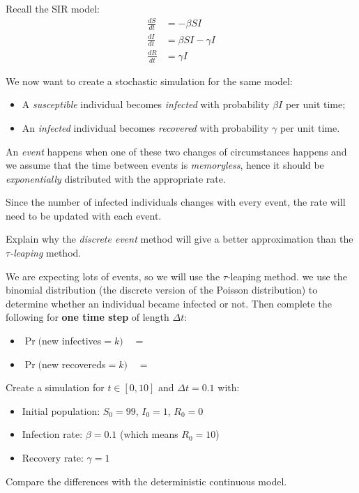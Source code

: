 \begin{slide}
\question \label{SIR_stochastic}
	
Recall the SIR model:
\begin{align*}
\frac{dS}{dt} 	& = - \beta SI \\
\frac{dI}{dt} & = \beta SI - \gamma I \\
\frac{dR}{dt} & = \gamma I
\end{align*}

We now want to create a stochastic simulation for the same model:
\begin{itemize}
	\item A \textit{susceptible} individual becomes \textit{infected} with probability $\beta I$ per unit time;
	\item An \textit{infected} individual becomes \textit{recovered} with probability $\gamma$ per unit time.
\end{itemize}

An \textit{event} happens when one of these two changes of circumstances happens and we assume that the time between events is \textit{memoryless}, hence it should be \textit{exponentially} distributed with the appropriate rate.

Since the number of infected individuals changes with every event, the rate will need to be updated with each event.

\begin{parts}
	\item Explain why the \textit{discrete event} method will give a better approximation than the  \textit{$\tau$-leaping} method.
	\item We are expecting lots of events, so we will use the $\tau$-leaping method.
		we use the binomial distribution (the discrete version of the Poisson distribution) to determine whether an individual became infected or not.
		Then complete the following for \textbf{one time step} of length $\Delta t$:
		\begin{itemize}
			\item $\Pr($new infectives$=k)\quad =\quad $
			\item $\Pr($new recovereds$=k)\quad =\quad $
		\end{itemize}
	\item Create a simulation for $t\in [0,10]$ and $\Delta t = 0.1$ with:
	\begin{itemize}
		\item Initial population: $S_0=99$, $I_0=1$, $R_0=0$
		\item Infection rate: $\beta=0.1$ (which means $R_0=10$)
		\item Recovery rate: $\gamma =1$
	\end{itemize}
	\item Compare the differences with the deterministic continuous model.
\end{parts}

\end{slide}


